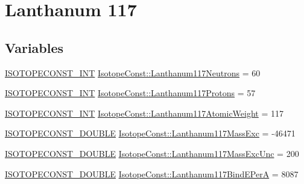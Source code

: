 \hypertarget{group___isotope_const-_lanthanum-_la117}{}\section{Lanthanum 117}
\label{group___isotope_const-_lanthanum-_la117}
\subsection*{Variables}
\begin{DoxyCompactItemize}
\item 
\mbox{\hyperlink{group___isotope_const-_macros_ga5f18360b3e99483a35c32d789e62621c}{I\+S\+O\+T\+O\+P\+E\+C\+O\+N\+S\+T\+\_\+\+I\+NT}} \mbox{\hyperlink{group___isotope_const-_lanthanum-_la117_gaacfb7d3045d678250d7690af61bc6340}{Isotope\+Const\+::\+Lanthanum117\+Neutrons}} = 60
\item 
\mbox{\hyperlink{group___isotope_const-_macros_ga5f18360b3e99483a35c32d789e62621c}{I\+S\+O\+T\+O\+P\+E\+C\+O\+N\+S\+T\+\_\+\+I\+NT}} \mbox{\hyperlink{group___isotope_const-_lanthanum-_la117_ga1bca40f3784a30faf4ad78be9dffded7}{Isotope\+Const\+::\+Lanthanum117\+Protons}} = 57
\item 
\mbox{\hyperlink{group___isotope_const-_macros_ga5f18360b3e99483a35c32d789e62621c}{I\+S\+O\+T\+O\+P\+E\+C\+O\+N\+S\+T\+\_\+\+I\+NT}} \mbox{\hyperlink{group___isotope_const-_lanthanum-_la117_ga62f099ae9eb7a96d6ecf40936637c6ad}{Isotope\+Const\+::\+Lanthanum117\+Atomic\+Weight}} = 117
\item 
\mbox{\hyperlink{group___isotope_const-_macros_ga8f45a7272ce02c0b4c65c44636ed719a}{I\+S\+O\+T\+O\+P\+E\+C\+O\+N\+S\+T\+\_\+\+D\+O\+U\+B\+LE}} \mbox{\hyperlink{group___isotope_const-_lanthanum-_la117_ga84c6548f18a532b684d511aff34d673f}{Isotope\+Const\+::\+Lanthanum117\+Mass\+Exc}} = -\/46471
\item 
\mbox{\hyperlink{group___isotope_const-_macros_ga8f45a7272ce02c0b4c65c44636ed719a}{I\+S\+O\+T\+O\+P\+E\+C\+O\+N\+S\+T\+\_\+\+D\+O\+U\+B\+LE}} \mbox{\hyperlink{group___isotope_const-_lanthanum-_la117_gadcf2d0aaaf43251534422a2ca302a89a}{Isotope\+Const\+::\+Lanthanum117\+Mass\+Exc\+Unc}} = 200
\item 
\mbox{\hyperlink{group___isotope_const-_macros_ga8f45a7272ce02c0b4c65c44636ed719a}{I\+S\+O\+T\+O\+P\+E\+C\+O\+N\+S\+T\+\_\+\+D\+O\+U\+B\+LE}} \mbox{\hyperlink{group___isotope_const-_lanthanum-_la117_ga0f12f1cd0bda0d14386dfb5dfa2b394d}{Isotope\+Const\+::\+Lanthanum117\+Bind\+E\+PerA}} = 8087
\item 

\end{DoxyCompactItemize}
